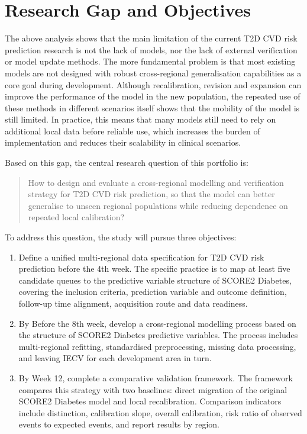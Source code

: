 \documentclass[conference]{IEEEtran}
\begin{document}
\section{Research Gap and Objectives }
The above analysis shows that the main limitation of the current T2D CVD risk prediction research is not the lack of models, nor the lack of external verification or model update methods. The more fundamental problem is that most existing models are not designed with robust cross-regional generalisation capabilities as a core goal during development. Although recalibration, revision and expansion can improve the performance of the model in the new population, the repeated use of these methods in different scenarios itself shows that the mobility of the model is still limited. In practice, this means that many models still need to rely on additional local data before reliable use, which increases the burden of implementation and reduces their scalability in clinical scenarios.

Based on this gap, the central research question of this portfolio is:

\begin{quote}
How to design and evaluate a cross-regional modelling and verification strategy for T2D CVD risk prediction, so that the model can better generalise to unseen regional populations while reducing dependence on repeated local calibration?
\end{quote}

To address this question, the study will pursue three objectives:

\begin{enumerate}
    \item Define a unified multi-regional data specification for T2D CVD risk prediction before the 4th week. The specific practice is to map at least five candidate queues to the predictive variable structure of SCORE2 Diabetes, covering the inclusion criteria, prediction variable and outcome definition, follow-up time alignment, acquisition route and data readiness.

    \item By Before the 8th week, develop a cross-regional modelling process based on the structure of SCORE2 Diabetes predictive variables. The process includes multi-regional refitting, standardised preprocessing, missing data processing, and leaving IECV for each development area in turn.

    \item By Week 12, complete a comparative validation framework. The framework compares this strategy with two baselines: direct migration of the original SCORE2 Diabetes model and local recalibration. Comparison indicators include distinction, calibration slope, overall calibration, risk ratio of observed events to expected events, and report results by region.
    
\end{enumerate}
\end{document}
